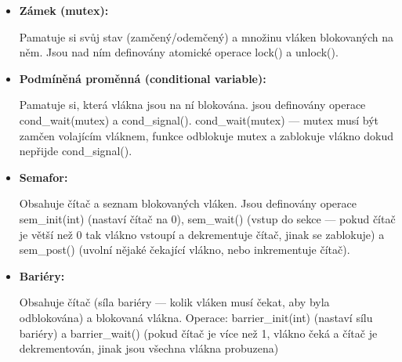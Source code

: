 \begin{itemize}
	\item \textbf{Zámek (mutex):}
	
	Pamatuje si svůj stav (zamčený/odemčený) a množinu vláken blokovaných na něm. Jsou nad ním definovány atomické operace lock() a unlock().
	
	\item \textbf{Podmíněná proměnná (conditional variable):}
	
	Pamatuje si, která vlákna jsou na ní blokována. jsou definovány operace cond\_wait(mutex) a cond\_signal(). cond\_wait(mutex) --- mutex musí být zamčen volajícím vláknem, funkce odblokuje mutex a zablokuje vlákno dokud nepřijde cond\_signal().
	
	\item \textbf{Semafor:}
	
	Obsahuje čítač a seznam blokovaných vláken. Jsou definovány operace sem\_init(int) (nastaví čítač na 0), sem\_wait() (vstup do sekce --- pokud čítač je větší než 0 tak vlákno vstoupí a dekrementuje čítač, jinak se zablokuje) a sem\_post() (uvolní nějaké čekající vlákno, nebo inkrementuje čítač).
	
	\item \textbf{Bariéry:}
	
	Obsahuje čítač (síla bariéry --- kolik vláken musí čekat, aby byla odblokována) a blokovaná vlákna. Operace: barrier\_init(int) (nastaví sílu bariéry) a barrier\_wait() (pokud čítač je více než 1, vlákno čeká a čítač je dekrementován, jinak jsou všechna vlákna probuzena)
	
\end{itemize}

